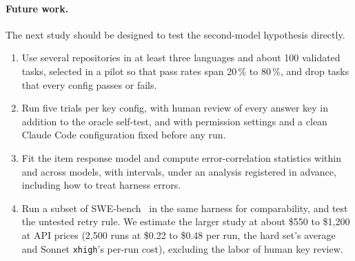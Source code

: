 \paragraph{Future work.}
The next study should be designed to test the second-model hypothesis directly.
\begin{enumerate}[leftmargin=*]
  \item Use several repositories in at least three languages and about 100 validated tasks, selected in a pilot so that pass rates span 20\,\% to 80\,\%, and drop tasks that every config passes or fails.
  \item Run five trials per key config, with human review of every answer key in addition to the oracle self-test, and with permission settings and a clean Claude Code configuration fixed before any run.
  \item Fit the item response model and compute error-correlation statistics within and across models, with intervals, under an analysis registered in advance, including how to treat harness errors.
  \item Run a subset of SWE-bench~\cite{jimenez2024swebench} in the same harness for comparability, and test the untested retry rule. We estimate the larger study at about \$550 to \$1,200 at API prices (2,500 runs at \$0.22 to \$0.48 per run, the hard set's average and Sonnet \texttt{xhigh}'s per-run cost), excluding the labor of human key review.
\end{enumerate}
